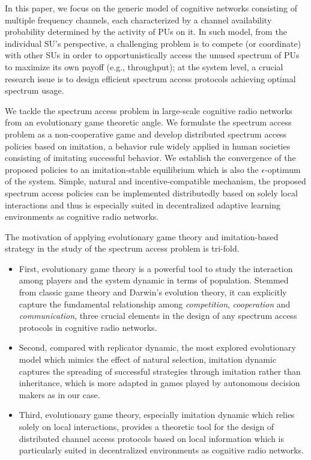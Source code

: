 \documentclass[12pt, onecolumn]{IEEEtran}
\theoremstyle{plain}
\theoremstyle{definition}
\begin{document}
In this paper, we focus on the generic model of cognitive networks consisting of multiple frequency channels, each characterized by a channel availability probability determined by the activity of PUs on it. In such model, from the individual SU's perspective, a challenging problem is to compete (or coordinate) with other SUs in order to opportunistically access the unused spectrum of PUs to maximize its own payoff (e.g., throughput); at the system level, a crucial research issue is to design efficient spectrum access protocols achieving optimal spectrum usage.

We tackle the spectrum access problem in large-scale cognitive radio networks from an evolutionary game theoretic angle. We formulate the spectrum access problem as a non-cooperative game and develop distributed spectrum access policies based on imitation, a behavior rule widely applied in human societies consisting of imitating successful behavior. We establish the convergence of the proposed policies to an imitation-stable equilibrium which is also the $\epsilon$-optimum of the system. Simple, natural and incentive-compatible mechanism, the proposed spectrum access policies can be implemented distributedly based on solely local interactions and thus is especially suited in decentralized adaptive learning environments as cognitive radio networks.

The motivation of applying evolutionary game theory and imitation-based strategy in the study of the spectrum access problem is tri-fold.
\begin{itemize}
\item First, evolutionary game theory is a powerful tool to study the interaction among players and the system dynamic in terms of population. Stemmed from classic game theory and Darwin's evolution theory, it can explicitly capture the fundamental relationship among \textit{competition}, \textit{cooperation} and \textit{communication}, three crucial elements in the design of any spectrum access protocols in cognitive radio networks.
\item Second, compared with replicator dynamic, the most explored evolutionary model which mimics the effect of natural selection, imitation dynamic captures the spreading of successful strategies through imitation ra\-ther than inheritance, which is more adapted in games played by autonomous decision makers as in our case.
\item Third, evolutionary game theory, especially imitation dynamic which relies solely on local interactions, provides a theoretic tool for the design of distributed channel access protocols based on local information which is particularly suited in decentralized environments as cognitive radio networks.
\end{itemize}
\end{document}

